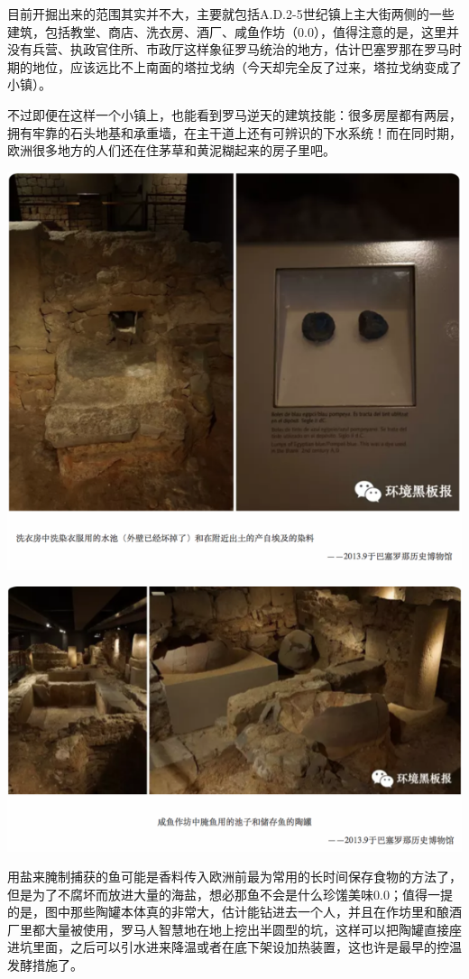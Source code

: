 \documentclass[]{book}
\begin{document}
目前开掘出来的范围其实并不大，主要就包括A.D.2-5世纪镇上主大街两侧的一些建筑，包括教堂、商店、洗衣房、酒厂、咸鱼作坊（0.0），值得注意的是，这里并没有兵营、执政官住所、市政厅这样象征罗马统治的地方，估计巴塞罗那在罗马时期的地位，应该远比不上南面的塔拉戈纳（今天却完全反了过来，塔拉戈纳变成了小镇）。

不过即便在这样一个小镇上，也能看到罗马逆天的建筑技能：很多房屋都有两层，拥有牢靠的石头地基和承重墙，在主干道上还有可辨识的下水系统！而在同时期，欧洲很多地方的人们还在住茅草和黄泥糊起来的房子里吧。

\includegraphics[width=8.33in]{images/xt16}

\includegraphics[width=8.33in]{images/xt17}

用盐来腌制捕获的鱼可能是香料传入欧洲前最为常用的长时间保存食物的方法了，但是为了不腐坏而放进大量的海盐，想必那鱼不会是什么珍馐美味0.0；值得一提的是，图中那些陶罐本体真的非常大，估计能钻进去一个人，并且在作坊里和酿酒厂里都大量被使用，罗马人智慧地在地上挖出半圆型的坑，这样可以把陶罐直接座进坑里面，之后可以引水进来降温或者在底下架设加热装置，这也许是最早的控温发酵措施了。
\end{document}
